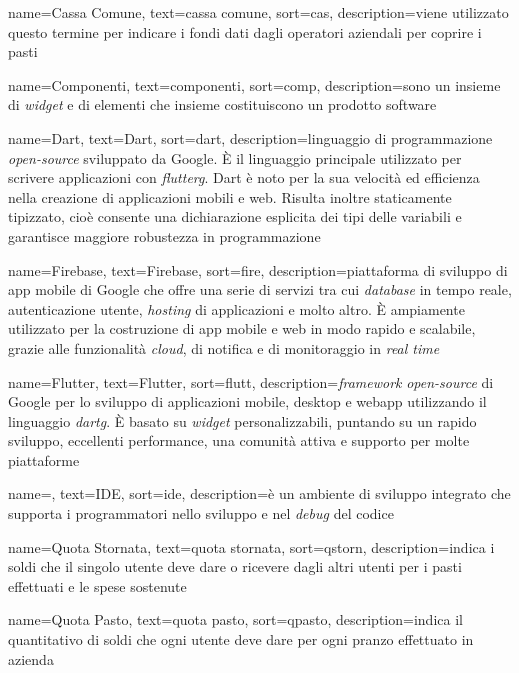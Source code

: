  {
    name=Cassa Comune,
    text=cassa comune,
    sort=cas,
    description={viene utilizzato questo termine per indicare i fondi dati dagli operatori aziendali per coprire i pasti}
}

 {
    name=Componenti,
    text=componenti,
    sort=comp,
    description={sono un insieme di \emph{widget} e di elementi che insieme costituiscono un prodotto software}
}

 {
    name=Dart,
    text=Dart,
    sort=dart,
    description={linguaggio di programmazione \textit{open-source} sviluppato da Google. 
    È il linguaggio principale utilizzato per scrivere applicazioni con \emph{\gls{flutterg}}. Dart è noto per la sua velocità ed efficienza nella creazione di applicazioni mobili e web.
    Risulta inoltre staticamente tipizzato, cioè consente una dichiarazione esplicita dei tipi delle variabili e garantisce maggiore robustezza in programmazione}
}

 {
    name=Firebase,
    text=Firebase,
    sort=fire,
    description={piattaforma di sviluppo di app mobile di Google che offre una serie di servizi tra cui \emph{database} in tempo reale, autenticazione utente, \emph{hosting} di applicazioni e molto altro. 
    È ampiamente utilizzato per la costruzione di app mobile e web in modo rapido e scalabile, grazie alle funzionalità \emph{cloud}, di notifica e di monitoraggio in \emph{real time}}
}

 {
    name=Flutter,
    text=Flutter,
    sort=flutt,
    description={\textit{framework} \textit{open-source} di Google per lo sviluppo di applicazioni mobile, desktop e webapp utilizzando il linguaggio \emph{\gls{dartg}}. È basato su \emph{widget} personalizzabili, puntando su un rapido sviluppo, eccellenti performance, una comunità attiva e supporto per molte piattaforme}
}

 {
    name=,
    text=IDE,
    sort=ide,
    description={è un ambiente di sviluppo integrato che supporta i programmatori nello sviluppo e nel \emph{debug} del codice}
}

 {
    name=Quota Stornata,
    text=quota stornata,
    sort=qstorn,
    description={indica i soldi che il singolo utente deve dare o ricevere dagli altri utenti per i pasti effettuati e le spese sostenute}
}

 {
    name=Quota Pasto,
    text=quota pasto,
    sort=qpasto,
    description={indica il quantitativo di soldi che ogni utente deve dare per ogni pranzo effettuato in azienda}
}

